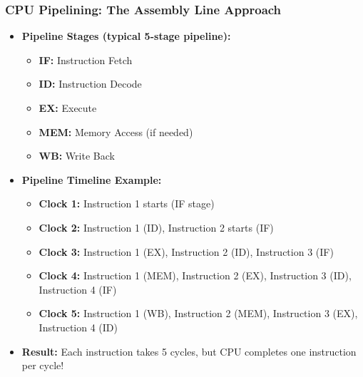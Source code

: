 \begin{frame}
\frametitle{CPU Pipelining: The Assembly Line Approach}
\begin{itemize}
    \item \textbf{Pipeline Stages (typical 5-stage pipeline):}
    \begin{itemize}
        \item \textbf{IF:} Instruction Fetch
        \item \textbf{ID:} Instruction Decode  
        \item \textbf{EX:} Execute
        \item \textbf{MEM:} Memory Access (if needed)
        \item \textbf{WB:} Write Back
    \end{itemize}
    \item \textbf{Pipeline Timeline Example:}
    \begin{itemize}
        \item \textbf{Clock 1:} Instruction 1 starts (IF stage)
        \item \textbf{Clock 2:} Instruction 1 (ID), Instruction 2 starts (IF)
        \item \textbf{Clock 3:} Instruction 1 (EX), Instruction 2 (ID), Instruction 3 (IF)
        \item \textbf{Clock 4:} Instruction 1 (MEM), Instruction 2 (EX), Instruction 3 (ID), Instruction 4 (IF)
        \item \textbf{Clock 5:} Instruction 1 (WB), Instruction 2 (MEM), Instruction 3 (EX), Instruction 4 (ID)
    \end{itemize}
    \item \textbf{Result:} Each instruction takes 5 cycles, but CPU completes one instruction per cycle!
\end{itemize}
\end{frame}

